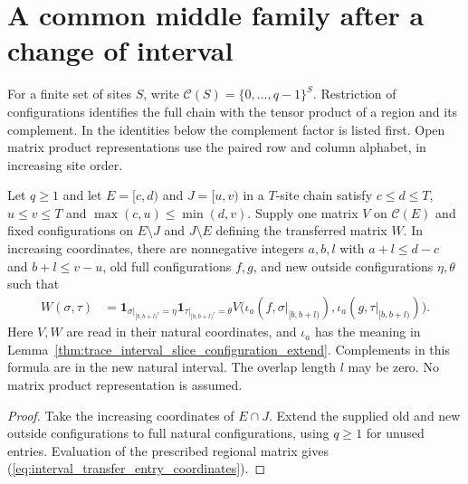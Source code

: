 \section{A common middle family after a change of interval}

For a finite set of sites $S$, write $\mathcal C(S)=\{0,\ldots,q-1\}^S$.
Restriction of configurations identifies the full chain with the tensor
product of a region and its complement. In the identities below the
complement factor is listed first. Open matrix product representations
use the paired row and column alphabet, in increasing site order.


\begin{lemma}
    \label{thm:interval_transfer_entry_coordinates}
    \leanok
    Let $q\ge1$ and let $E=\lbrack c,d)$ and $J=\lbrack u,v)$ in a $T$-site chain satisfy
    $c\le d\le T$, $u\le v\le T$ and $\max(c,u)\le\min(d,v)$.
    Supply one matrix $V$ on $\mathcal C(E)$ and fixed configurations on
    $E\setminus J$ and $J\setminus E$ defining the transferred matrix $W$.
    In increasing coordinates, there are nonnegative integers $a,b,l$ with
    $a+l\le d-c$ and $b+l\le v-u$, old full configurations $f,g$, and new
    outside configurations $\eta,\theta$ such that
    \begin{align}
        W(\sigma,\tau)
         & =\mathbf1_{\sigma|_{[b,b+l)^c}=\eta}
        \mathbf1_{\tau|_{[b,b+l)^c}=\theta}
        V\bigl(\iota_a(f,\sigma|_{[b,b+l)}),
        \iota_a(g,\tau|_{[b,b+l)})\bigr).
        \label{eq:interval_transfer_entry_coordinates}
    \end{align}
    Here $V,W$ are read in their natural coordinates, and $\iota_a$ has
    the meaning in Lemma~\ref{thm:trace_interval_slice_configuration_extend}.
    Complements in this formula are in the new natural interval.
    The overlap length $l$ may be zero. No matrix product representation
    is assumed.
\end{lemma}
\begin{proof}\leanok
    Take the increasing coordinates of $E\cap J$. Extend the supplied old
    and new outside configurations to full natural configurations, using
    $q\ge1$ for unused entries. Evaluation of the prescribed regional
    matrix gives (\ref{eq:interval_transfer_entry_coordinates}).
\end{proof}

